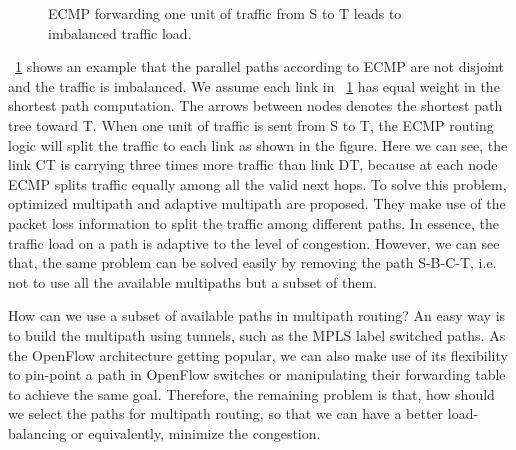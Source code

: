 \documentclass[conference]{IEEEtran}
\begin{document}
\begin{figure}
\begin{center}
\end{center}
\caption{ECMP forwarding one unit of traffic from S to T leads to imbalanced traffic load.}\label{fig:badecmp}
\end{figure}

\figurename~\ref{fig:badecmp} shows an example that the parallel
paths according to ECMP are not disjoint and the traffic is imbalanced. We
assume each link in \figurename~\ref{fig:badecmp} has equal weight in the
shortest path computation. The arrows between nodes denotes the shortest path
tree toward T. When one unit of traffic is sent from S to T, the ECMP routing
logic will split the traffic to each link as shown in the figure. Here we can
see, the link CT is carrying three times more traffic than link DT, because at
each node ECMP splits traffic equally among all the valid next hops. To solve
this problem, optimized multipath \cite{ospfomp} and adaptive multipath
\cite{gzrr03} are proposed. They make use of the packet loss information to
split the traffic among different paths. In essence, the traffic load on a
path is adaptive to the level of congestion. However, we can see that, the same
problem can be solved easily by removing the path S-B-C-T, i.e. not to use all
the available multipaths but a subset of them.

How can we use a subset of available paths in multipath routing? An easy way is
to build the multipath using tunnels, such as the MPLS label switched paths. As
the OpenFlow architecture \cite{mabpprst08} getting popular, we can also make
use of its flexibility to pin-point a path in OpenFlow switches or manipulating
their forwarding table to achieve the same goal. Therefore, the remaining
problem is that, how should we select the paths for multipath routing, so that
we can have a better load-balancing or equivalently, minimize the congestion.
\end{document}
